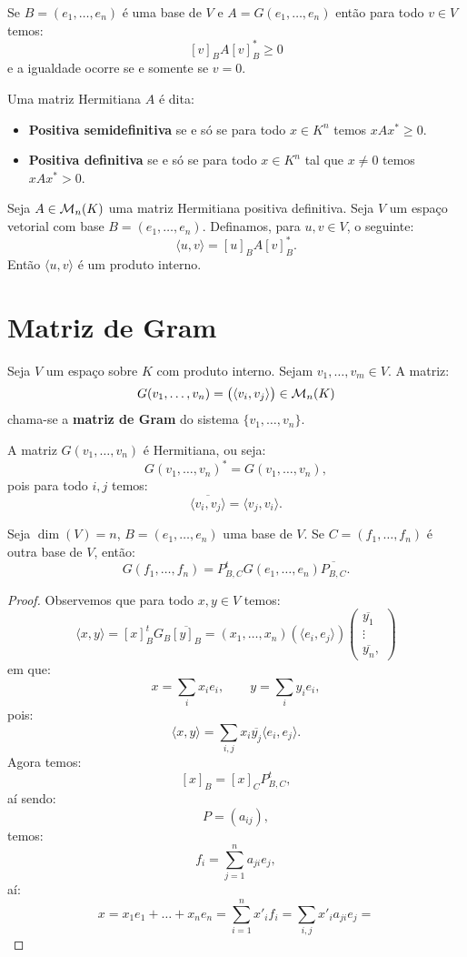 \documentclass[11pt,twoside,a4paper]{book}
\begin{document}
\noindent
Se $B=(e_1,\dots,e_n)$ é uma base de $V$ e $A=G(e_1,\dots,e_n)$ então para todo $v\in V$ temos:
\[
[v]_BA[v]_B^*\geq 0
\]
e a igualdade ocorre se e somente se $v=0$.

\begin{definicao}
Uma matriz Hermitiana $A$ é dita:
\begin{itemize}
\item \textbf{Positiva semidefinitiva} se e só se para todo $x\in K^n$ temos $xAx^*\geq 0$.
\item \textbf{Positiva definitiva} se e só se para todo $x\in K^n$ tal que $x\neq 0$ temos $xAx^*>0$.
\end{itemize}
\end{definicao}

\begin{proposicao}
Seja $A\in\mathcal{M}_{n}(K)$ uma matriz Hermitiana positiva definitiva. Seja $V$ um espaço vetorial com base $B=(e_1,\dots,e_n)$. Definamos, para $u,v\in V$, o seguinte:
\[
\langle u,v\rangle=[u]_BA[v]_B^*.
\]
Então $\langle u,v\rangle$ é um produto interno.
\end{proposicao}

\newpage

\section{Matriz de Gram}

\begin{definicao}
Seja $V$ um espaço sobre $K$ com produto interno. Sejam $v_1,\dots,v_m\in V$. A matriz:
\[
G(v_1,\dots,v_n)=\left(\langle v_i,v_j\rangle\right)\in\mathcal{M}_{n}(K)
\]
chama-se a \textbf{matriz de Gram} do sistema $\{v_1,\dots,v_n\}$.
\end{definicao}

\noindent
A matriz $G(v_1,\dots,v_n)$ é Hermitiana, ou seja:
\[
G(v_1,\dots,v_n)^*=G(v_1,\dots,v_n),
\]
pois para todo $i,j$ temos:
\[
\overline{\langle v_i,v_j\rangle}=\langle v_j,v_i\rangle.
\]

\begin{proposicao}
Seja $\dim(V)=n$, $B=(e_1,\dots,e_n)$ uma base de $V$. Se $C=(f_1,\dots,f_n)$ é outra base de $V$, então:
\[
G(f_1,\dots,f_n)=P^t_{B,C}G(e_1,\dots,e_n)\overline{P_{B,C}}.
\]
\end{proposicao}
\begin{proof}
Observemos que para todo $x,y\in V$ temos:
\[
\langle x,y\rangle=[x]^t_BG_B\overline{[y]_B}=(x_1,\dots,x_n)\left(\langle e_i,e_j\rangle\right)\begin{pmatrix}
\overline{y_1}\\\vdots\\\overline{y_n},
\end{pmatrix}
\]
em que:
\[
x=\sum_i x_ie_i,\quad\quad y=\sum_i y_ie_i,
\]
pois:
\[
\langle x,y\rangle=\sum_{i,j}x_i\overline{y_j}\langle e_i,e_j\rangle.
\]
Agora temos:
\[
[x]_B=[x]_CP_{B,C}^t,
\]
aí sendo:
\[
P=(a_{ij}),
\]
temos:
\[
f_i=\sum_{j=1}^na_{ji}e_j,
\]
aí:
\[
x=x_1e_1+\dots+x_ne_n=\sum_{i=1}^nx'_if_i=\sum_{i,j}x'_ia_{ji}e_j=
\]
\end{proof}
\end{document}

